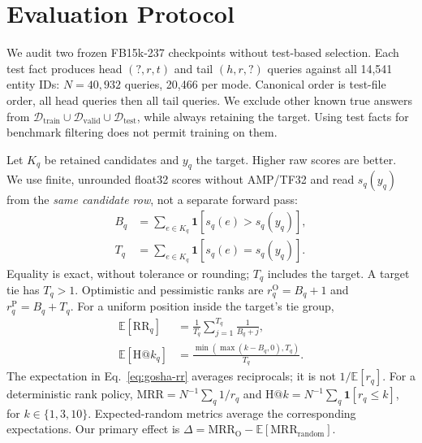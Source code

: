 \providecommand{\goshaRoot}{report/gosha}




\section{Evaluation Protocol}
\label{sec:gosha-protocol}
We audit two frozen FB15k-237 checkpoints without test-based selection.
Each test fact produces head $(?,r,t)$ and tail $(h,r,?)$ queries against
all 14,541 entity IDs: $N=40{,}932$ queries, 20,466 per mode. Canonical order
is test-file order, all head queries then all tail queries. We exclude
other known true answers from
$\mathcal{D}_{\mathrm{train}}\cup\mathcal{D}_{\mathrm{valid}}
\cup\mathcal{D}_{\mathrm{test}}$, while always retaining the target.
Using test facts for benchmark filtering does not permit training on them.

Let $K_q$ be retained candidates and $y_q$ the target. Higher raw scores are
better. We use finite, unrounded float32 scores without AMP/TF32 and read
$s_q(y_q)$ from the \emph{same candidate row}, not a separate forward pass:
\begin{align}
 B_q&=\sum_{e\in K_q}\mathbf{1}[s_q(e)>s_q(y_q)],\\
 T_q&=\sum_{e\in K_q}\mathbf{1}[s_q(e)=s_q(y_q)].
\end{align}
Equality is exact, without tolerance or rounding; $T_q$ includes the target.
A target tie has $T_q>1$. Optimistic and pessimistic ranks are
$r_q^{\mathrm{O}}=B_q+1$ and $r_q^{\mathrm{P}}=B_q+T_q$.
For a uniform position inside the target's tie group,
\begin{align}
 \mathbb{E}[\mathrm{RR}_q]&=\frac{1}{T_q}
       \sum_{j=1}^{T_q}\frac{1}{B_q+j},\label{eq:gosha-rr}\\
 \mathbb{E}[\mathrm{H@}k_q]&=
       \frac{\min(\max(k-B_q,0),T_q)}{T_q}.
\end{align}
The expectation in Eq.~\ref{eq:gosha-rr} averages reciprocals; it is not
$1/\mathbb{E}[r_q]$. For a deterministic rank policy,
$\mathrm{MRR}=N^{-1}\sum_q1/r_q$ and
$\mathrm{H@}k=N^{-1}\sum_q\mathbf{1}[r_q\leq k]$, for $k\in\{1,3,10\}$.
Expected-random metrics average the corresponding expectations.
Our primary effect is
$\Delta=\mathrm{MRR}_{\mathrm{O}}-\mathbb{E}[\mathrm{MRR}_{\mathrm{random}}]$.

